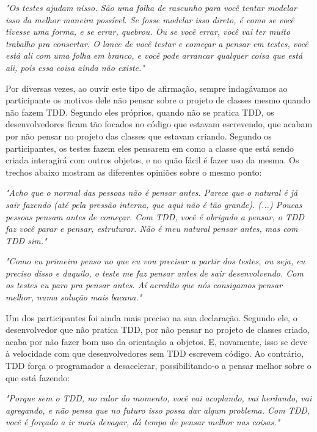 \begin{framed}
\textit{"Os testes ajudam nisso. São uma folha de rascunho para você tentar modelar
isso da melhor maneira possível. Se fosse modelar isso direto, é como se você tivesse
uma forma, e se errar, quebrou. Ou se você errar, você vai ter muito trabalho pra consertar.
O lance de você testar e começar a pensar em testes, você está ali com uma folha em branco,
e você pode arrancar qualquer coisa que está ali, pois essa coisa ainda não existe."}
\end{framed}

Por diversas vezes, ao ouvir este tipo de afirmação, sempre indagávamos ao participante
os motivos dele não pensar sobre o projeto de classes mesmo quando não fazem TDD. 
Segundo eles próprios, quando não se pratica TDD, os desenvolvedores ficam
tão focados no código que estavam escrevendo, que acabam por não pensar no
projeto das classes que estavam criando. Segundo os participantes, os testes fazem eles pensarem
em como a classe que está sendo criada interagirá com outros objetos, e no quão
fácil é fazer uso da mesma.
Os trechos abaixo mostram as diferentes opiniões sobre o mesmo ponto:

\begin{framed}
\textit{"Acho que o normal das pessoas não é pensar antes. Parece que o natural
é já sair fazendo (até pela pressão interna, que aqui não é tão grande). (...) Poucas pessoas pensam
antes de começar. Com TDD, você é obrigado a pensar, o TDD faz você parar e pensar, estruturar. Não
é meu natural pensar antes, mas com TDD sim."}
\end{framed}

\begin{framed}
\textit{"Como eu primeiro penso no que eu vou precisar a partir dos testes, ou seja, eu preciso
disso e daquilo, o teste me faz pensar antes de sair desenvolvendo. Com os testes eu paro pra pensar antes.
Aí acredito que nós consigamos pensar melhor, numa solução mais bacana."}
\end{framed}

Um dos participantes foi ainda mais preciso na sua declaração. Segundo ele, o desenvolvedor que não pratica
TDD, por não pensar no projeto de classes criado, acaba por não fazer bom uso da orientação a objetos.
E, novamente, isso se deve à velocidade com que desenvolvedores sem TDD escrevem código. Ao contrário,
TDD força o programador a desacelerar, possibilitando-o a pensar melhor sobre o que está fazendo:

\begin{framed}
\textit{"Porque sem o TDD, no calor do momento, você vai acoplando, vai herdando, vai agregando, e não pensa
que no futuro isso possa dar algum problema. Com TDD, você é forçado a ir mais devagar, dá tempo de pensar melhor nas
coisas."}
\end{framed}

